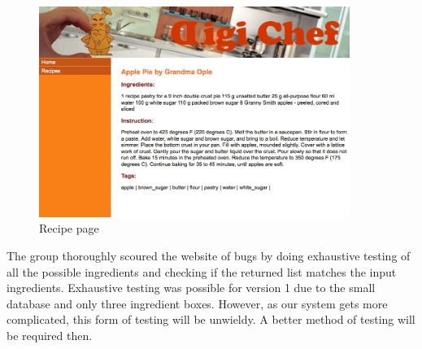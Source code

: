 \begin{figure}
\includegraphics[width=0.9\textwidth]{result_3}
\caption{Recipe page}
\label{fig:result_3}
\end{figure}

The group thoroughly scoured the website of bugs by doing exhaustive testing of all the possible ingredients and checking if the returned list matches the input ingredients. Exhaustive testing was possible for version 1 due to the small database and only three ingredient boxes. However, as our system gets more complicated, this form of testing will be unwieldy. A better method of testing will be required then.



